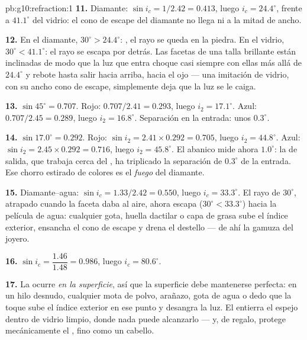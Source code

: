 \begin{solution}{pb:g10:refraction:1}
\textbf{11.} Diamante: $\sin i_c = 1/2.42 = 0.413$, luego
$i_c = 24.4^\circ$, frente a $41.1^\circ$ del vidrio: el cono de escape
del diamante no llega ni a la mitad de ancho.

\textbf{12.} En el diamante, $30^\circ > 24.4^\circ$: , el rayo se queda en la piedra. En el vidrio,
$30^\circ < 41.1^\circ$: el rayo se escapa por detrás. Las facetas de
una talla brillante están inclinadas de modo que la luz que entra
choque casi siempre con ellas más allá de $24.4^\circ$ y rebote hasta
salir hacia arriba, hacia el ojo --- una imitación de vidrio, con su
ancho cono de escape, simplemente deja que la luz se le caiga.

\textbf{13.} $\sin 45^\circ = 0.707$. Rojo: $0.707/2.41 = 0.293$, luego
$i_2 = 17.1^\circ$. Azul: $0.707/2.45 = 0.289$, luego
$i_2 = 16.8^\circ$. Separación en la entrada: unos $0.3^\circ$.

\textbf{14.} $\sin 17.0^\circ = 0.292$. Rojo:
$\sin i_2 = 2.41 \times 0.292 = 0.705$, luego $i_2 = 44.8^\circ$. Azul:
$\sin i_2 = 2.45 \times 0.292 = 0.716$, luego $i_2 = 45.8^\circ$. El
abanico mide ahora $1.0^\circ$: la  de salida, que trabaja
cerca del , ha triplicado la separación de $0.3^\circ$ de
la entrada. Ese chorro estirado de colores es el \emph{fuego} del
diamante.

\textbf{15.} Diamante--agua: $\sin i_c = 1.33/2.42 = 0.550$, luego
$i_c = 33.3^\circ$. El rayo de $30^\circ$, atrapado cuando la faceta
daba al aire, ahora escapa ($30^\circ < 33.3^\circ$) hacia la película
de agua: cualquier gota, huella dactilar o capa de grasa sube el índice
exterior, ensancha el cono de escape y drena el destello --- de ahí la
gamuza del joyero.

\textbf{16.} $\sin i_c = \dfrac{1.46}{1.48} = 0.986$, luego
$i_c = 80.6^\circ$.

\textbf{17.} La  ocurre \emph{en la superficie},
así que la superficie debe mantenerse perfecta: en un hilo desnudo,
cualquier mota de polvo, arañazo, gota de agua o dedo que la toque sube
el índice exterior en ese punto y desangra la luz. El 
entierra el espejo dentro de vidrio limpio, donde nada puede alcanzarlo
--- y, de regalo, protege mecánicamente el , fino como un cabello.


\end{solution}
